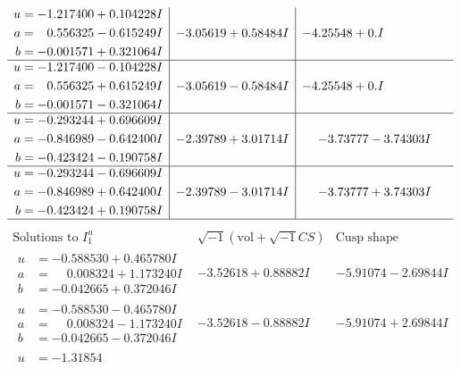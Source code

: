 \documentclass[1p]{elsarticle_modified}
\theoremstyle{definition}
\newcommand{\I}{\sqrt{-1}}
\begin{document}
$$\begin{array}{c|c|c}
\begin{aligned}
u &= -1.217400 + 0.104228 I \\
a &= \phantom{-}0.556325 - 0.615249 I \\
b &= -0.001571 + 0.321064 I\end{aligned}
 & -3.05619 + 0.58484 I & -4.25548 + 0. I\phantom{ +0.000000I} \\ \hline\begin{aligned}
u &= -1.217400 - 0.104228 I \\
a &= \phantom{-}0.556325 + 0.615249 I \\
b &= -0.001571 - 0.321064 I\end{aligned}
 & -3.05619 - 0.58484 I & -4.25548 + 0. I\phantom{ +0.000000I} \\ \hline\begin{aligned}
u &= -0.293244 + 0.696609 I \\
a &= -0.846989 - 0.642400 I \\
b &= -0.423424 - 0.190758 I\end{aligned}
 & -2.39789 + 3.01714 I & -3.73777 - 3.74303 I \\ \hline\begin{aligned}
u &= -0.293244 - 0.696609 I \\
a &= -0.846989 + 0.642400 I \\
b &= -0.423424 + 0.190758 I\end{aligned}
 & -2.39789 - 3.01714 I & -3.73777 + 3.74303 I\\
 \hline 
 \end{array}$$\newpage$$\begin{array}{c|c|c}  
\text{Solutions to }I^u_{1}& \I (\text{vol} + \sqrt{-1}CS) & \text{Cusp shape}\\
 \hline 
\begin{aligned}
u &= -0.588530 + 0.465780 I \\
a &= \phantom{-}0.008324 + 1.173240 I \\
b &= -0.042665 + 0.372046 I\end{aligned}
 & -3.52618 + 0.88882 I & -5.91074 - 2.69844 I \\ \hline\begin{aligned}
u &= -0.588530 - 0.465780 I \\
a &= \phantom{-}0.008324 - 1.173240 I \\
b &= -0.042665 - 0.372046 I\end{aligned}
 & -3.52618 - 0.88882 I & -5.91074 + 2.69844 I \\ \hline\begin{aligned}
u &= -1.31854\phantom{ +0.000000I} \\

\end{aligned}
\end{array}$$
\end{document}
